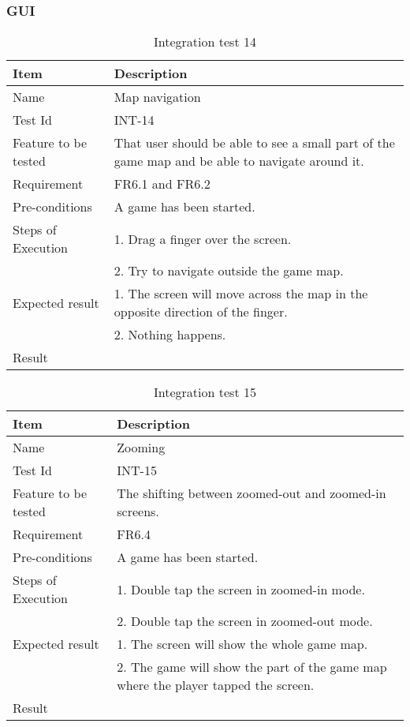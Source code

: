 \subsubsection{GUI}

\begin{table}[H]
\centering
	\begin{tabular}{ l | p{8cm} }
		\hline
		{\bf Item} & {\bf Description} \\ \hline
		Name & Map navigation \\ 
		Test Id & INT-14 \\ 
		Feature to be tested & That user should be able to see a small part of the game map and be able to navigate around it.\\ 
		Requirement & FR6.1 and FR6.2 \\ 
		Pre-conditions & A game has been started. \\ 
		Steps of Execution & 1. Drag a finger over the screen. \\
		& 2. Try to navigate outside the game map. \\
		Expected result & 1. The screen will move across the map in the opposite direction of the finger.\\ 
		& 2. Nothing happens. \\
		Result & \\ 
	\end{tabular}
	\caption{Integration test 14}
\end{table}

\begin{table}[H]
\centering
	\begin{tabular}{ l | p{8cm} }
		\hline
		{\bf Item} & {\bf Description} \\ \hline
		Name & Zooming \\ 
		Test Id & INT-15 \\ 
		Feature to be tested & The shifting between zoomed-out and zoomed-in screens. \\ 
		Requirement & FR6.4 \\ 
		Pre-conditions & A game has been started. \\ 
		Steps of Execution & 1. Double tap the screen in zoomed-in mode.\\ 
		& 2. Double tap the screen in zoomed-out mode. \\
		Expected result & 1. The screen will show the whole game map. \\
		& 2. The game will show the part of the game map where the player tapped the screen. \\
		Result & \\ 
	\end{tabular}
	\caption{Integration test 15}
\end{table}

